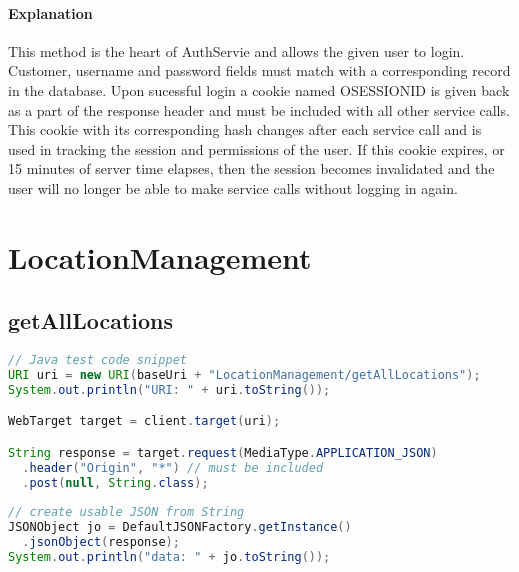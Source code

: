 \documentclass[
10pt, %
letterpaper, %
oneside, %
headinclude,footinclude, %
BCOR5mm, %
]{scrartcl}
\begin{document}
\paragraph{Explanation} This method is the heart of AuthServie and allows the given user to login. Customer, username and password fields must match with a corresponding record in the database. Upon sucessful login a cookie named OSESSIONID is given back as a part of the response header and must be included with all other service calls. This cookie with its corresponding hash changes after each service call and is used in tracking the session and permissions of the user. If this cookie expires, or 15 minutes of server time elapses, then the session becomes invalidated and the user will no longer be able to make service calls without logging in again.



\section{LocationManagement}


\subsection{\textbf{getAllLocations}}
\begin{lstlisting}[language=Java]
// Java test code snippet
URI uri = new URI(baseUri + "LocationManagement/getAllLocations");
System.out.println("URI: " + uri.toString());

WebTarget target = client.target(uri);

String response = target.request(MediaType.APPLICATION_JSON)
  .header("Origin", "*") // must be included
  .post(null, String.class);
  
// create usable JSON from String
JSONObject jo = DefaultJSONFactory.getInstance()
  .jsonObject(response);
System.out.println("data: " + jo.toString());
\end{lstlisting}

\end{document}
